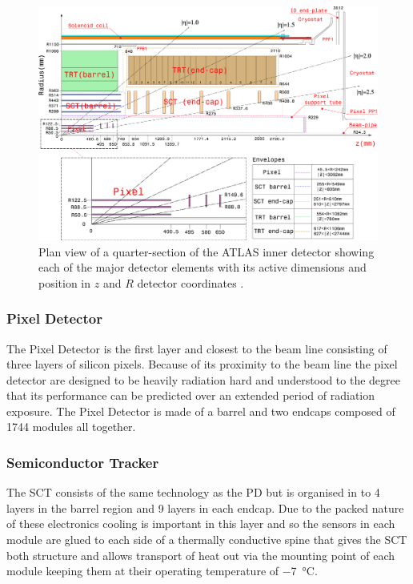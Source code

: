 		\begin{figure}[h]
			\begin{center}
				\includegraphics[scale=0.3]{images/FigID26-mod-011107.eps}
			\end{center}
			\caption{Plan view of a quarter-section of the ATLAS inner detector showing each of the major detector elements with its active dimensions and position in $z$ and $R$ detector coordinates \cite{Aad:1129811}.}
			\label{fig:ATLAS_inner_config}
		\end{figure}



		\subsubsection*{Pixel Detector} 

		The Pixel Detector is the first layer and closest to the beam line consisting of three layers of silicon pixels. Because of its proximity to the beam line the pixel detector are designed to be heavily radiation hard and understood to the degree that its performance can be predicted over an extended period of radiation exposure. The Pixel Detector is made of a barrel and two endcaps composed of 1744 modules all together. \\


		\subsubsection*{Semiconductor Tracker}

		The SCT consists of the same technology as the PD but is organised in to 4 layers in the barrel region and 9 layers in each endcap. Due to the packed nature of these electronics cooling is important in this layer and so the sensors in each module are glued to each side of a thermally conductive spine that gives the SCT both structure and allows transport of heat out via the mounting point of each module keeping them at their operating temperature of \SI{-7}{\degreeCelsius}.\\



